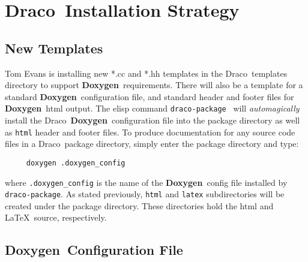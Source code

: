 \documentclass[11pt]{nmemo}
\newcommand{\draco}{{\normalfont\sffamily Draco}}
\newcommand{\doxy}{{\normalfont\bfseries Doxygen}}
\begin{document}

\section{\draco\ Installation Strategy}
\label{sec:draco}

\subsection{New Templates}

Tom Evans is installing new *.cc and *.hh templates in the \draco\ 
templates directory to support \doxy\ requirements. There will also be
a template for a standard \doxy\ configuration file, and standard
header and footer files for \doxy\ html output.  The elisp command
\texttt{draco-package}~\cite{xtm:9909} will \textit{automagically}
install the \draco\ \doxy\ configuration file into the package
directory as well as \texttt{html} header and footer files.
To produce documentation for any source code files in a
\draco\ package directory, simply enter the package directory and
type:
\begin{verbatim}
     doxygen .doxygen_config
\end{verbatim}
where \texttt{.doxygen\_config} is the name of the \doxy\ config file
installed by \texttt{draco-package}.  As stated previously,
\texttt{html} and \texttt{latex} subdirectories will be created under
the package directory.  These directories hold the html and \LaTeX\ 
source, respectively.

\subsection{\doxy\ Configuration File}
\label{sec:config}
\end{document}
